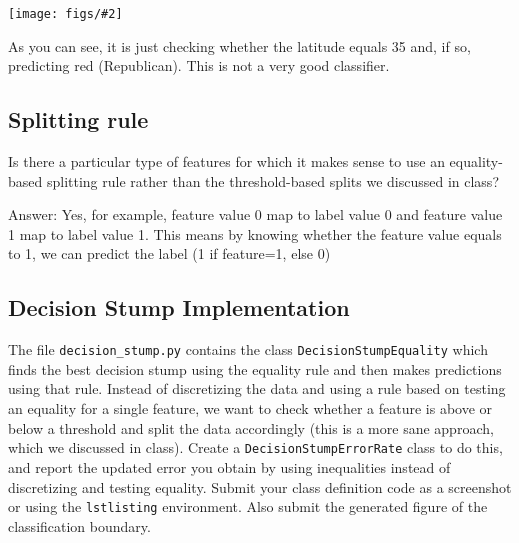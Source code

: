 \documentclass{article}
\def\ans#1{\par\gre{Answer: #1}}
\def\blu#1{{\color{blu}#1}}
\def\gre#1{{\color{gre}#1}}
\newcommand{\centerfig}[2]{\begin{center}\texttt{[image: figs/\#2]}\end{center}}
\begin{document}
  \centerfig{0.7}{q6_decisionBoundary}

  As you can see, it is just checking whether the latitude equals 35 and, if so, predicting red (Republican).
  This is not a very good classifier.

  \subsection{Splitting rule}

  Is there a particular type of features for which it makes sense to use an equality-based splitting rule rather than the threshold-based splits we discussed in class?
  \ans{Yes, for example, feature value 0 map to label value 0 and feature value 1 map to label value 1. This means by knowing whether the feature value equals to 1, we 
  can predict the label (1 if feature=1, else 0)}
  \clearpage

  \subsection{Decision Stump Implementation}

  The file \texttt{decision\string_stump.py} contains the class \texttt{DecisionStumpEquality} which
  finds the best decision stump using the equality rule and then makes predictions using that
  rule. Instead of discretizing the data and using a rule based on testing an equality for
  a single feature, we want to check whether a feature is above or below a threshold and
  split the data accordingly (this is a more sane approach, which we discussed in class).
  \blu{Create a \texttt{DecisionStumpErrorRate} class to do this, and report the updated error you
  obtain by using inequalities instead of discretizing and testing equality.
  Submit your class definition code as a screenshot or using the \texttt{lstlisting} environment.
  Also submit the generated figure of the classification boundary.}
\end{document}
